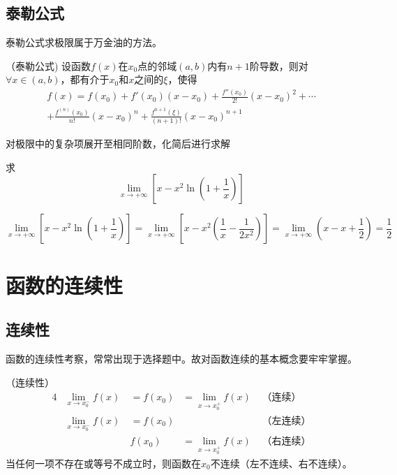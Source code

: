 \subsection{泰勒公式}
泰勒公式求极限属于万金油的方法。
\begin{theorem}
    \label{th:泰勒公式}
    （泰勒公式)
    设函数$f(x)$在$x_0$点的邻域$(a,b)$内有$n+1$阶导数，则对$\forall x\in (a,b)$，都有介于$x_0$和$x$之间的$\xi$，使得
    \begin{multline*}
        f(x) = f(x_0) + f'(x_0)(x-x_0) + \frac{f''(x_0)}{2!}(x-x_0)^2+\cdots\\
        +\frac{f^{(n)}(x_0)}{n!}(x-x_0)^n+\frac{f^{n+1}(\xi)}{(n+1)!}(x-x_0)^{n+1}
    \end{multline*}
\end{theorem}
\begin{situation}
    对极限中的复杂项展开至相同阶数，化简后进行求解
\end{situation}
\begin{example}
    求\[ \lim_{x\to +\infty}\left[x-x^2\ln\left(1+\frac{1}{x}\right)\right] \]
\end{example}
\begin{solution}
    \[
        \lim_{x\to +\infty}\left[x-x^2\ln\left(1+\frac{1}{x}\right)\right]
        = \lim_{x\to +\infty}\left[x-x^2\left(\frac{1}{x}-\frac{1}{2x^2}\right)\right]
        = \lim_{x\to +\infty}(x-x+\frac{1}{2})
        =\frac{1}{2}
    \]
\end{solution}

\section{函数的连续性}
\subsection{连续性}
函数的连续性考察，常常出现于选择题中。故对函数连续的基本概念要牢牢掌握。
\begin{definition}
    （连续性）
    \begin{alignat*}{4}
         & \lim_{x\to x_0^-}f(x) & ~ = f(x_0) & = \lim_{x\to x_0^+}f(x) & \text{ （连续）}   \\
         & \lim_{x\to x_0^-}f(x) & ~ = f(x_0) &                         & \text{ （左连续）} \\
         &                       & ~ f(x_0)   & = \lim_{x\to x_0^+}f(x) & \text{ （右连续）}
    \end{alignat*}
    当任何一项不存在或等号不成立时，则函数在$x_0$不连续（左不连续、右不连续）。
\end{definition}

